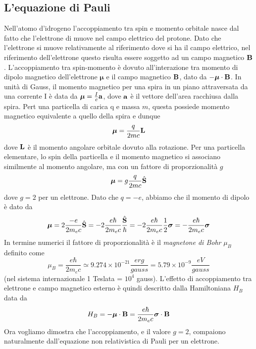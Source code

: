 \subsection{L'equazione di Pauli}

Nell'atomo d'idrogeno l'accoppiamento tra spin e momento orbitale nasce dal fatto che l'elettrone di muove nel campo elettrico del protone. Dato che l'elettrone si muove relativamente al riferimento dove si ha il campo elettrico, nel riferimento dell'elettrone questo risulta essere soggetto ad un campo magnetico $\bold{B}$. L'accoppiamento tra spin-momento \`e dovuto all'interazione tra momento di dipolo magnetico dell'elettrone $\boldsymbol{\mu}$ e il campo magnetico $\bold{B}$, dato da $- \boldsymbol{\mu} \cdot \bold{B}$. In unit\`a di Gauss, il momento magnetico per una spira in un piano attraversata da una corrente I \`e data da $\boldsymbol{\mu} = \frac{I}{c}\bold{a}$, dove $\bold{a}$ \`e il vettore dell'area racchiusa dalla spira. Pert una particella di carica q e massa $m$, questa possiede momento magnetico equivalente a quello della spira e dunque 
\begin{equation*}
	\boldsymbol{\mu} = \frac{q}{2mc} \bold{L}
\end{equation*}
dove $\bold{L}$ \`e il momento angolare orbitale dovuto alla rotazione. Per una particella elementare, lo spin della particella e il momento magnetico si associano similmente al momento angolare, ma con un fattore di proporzionalit\`a $g$
\begin{equation*}
	\boldsymbol{\mu} = g \frac{q}{2mc}\hat{\bold{S}}
\end{equation*} 
dove $g = 2$ per un elettrone. Dato che $q = -e$, abbiamo che il momento di dipolo \`e dato da 
\begin{equation*}
	\boldsymbol{\mu} = 2 \frac{-e}{2m_ec}\hat{\bold{S}} = -2 \frac{e \hbar}{2m_ec}\frac{\hat{\bold{S}}}{\hbar} = -2 \frac{e \hbar}{2m_ec} \frac{1}{2}\boldsymbol{\sigma} = - \frac{e \hbar }{2m_ec}\boldsymbol{\sigma}
\end{equation*}
In termine numerici il fattore di proporzionalit\`a \`e il \textit{magnetone di Bohr} $\mu_B$ definito come
\begin{equation*}
	\mu_{B} = \frac{e \hbar}{2m_ec} \simeq 9.274 \times 10^{-21} \frac{erg}{gauss} = 5.79 \times 10^{-9} \frac{eV}{gauss}
\end{equation*} 
(nel sistema internazionale 1 Teslata = $10^4$ gauss). L'effetto di accoppiamento tra elettrone e campo magnetico esterno \`e quindi descritto dalla Hamiltoniana $H_B$ data da
\begin{equation*}
	H_B = - \boldsymbol{\mu} \cdot \bold{B} = \frac{e\hbar}{2m_ec}\boldsymbol{\sigma} \cdot \bold{B}
\end{equation*}
Ora vogliamo dimostra che l'accoppiamento, e il valore $g=2$, compaiono naturalmente dall'equazione non relativistica di Pauli per un elettrone.

